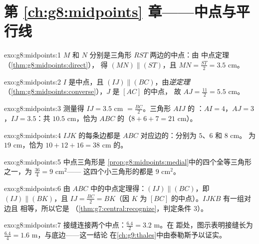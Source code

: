 \section*{第 \ref{ch:g8:midpoints} 章——中点与平行线}

\begin{solution}{exo:g8:midpoints:1}
$M$ 和 $N$ 分别是三角形 $RST$ 两边的中点：由
中点定理（\cref{thm:g8:midpoints:direct}），
得 $(MN) \parallel (ST)$，且 $MN = \frac{ST}{2} = 3.5$ cm。
\end{solution}

\begin{solution}{exo:g8:midpoints:2}
$I$ 是中点，且 $(IJ) \parallel (BC)$，由\emph{逆定理}
（\cref{thm:g8:midpoints:converse}），$J$ 是 $[AC]$ 的中点，
故 $AJ = \frac{11}{2} = 5.5$ cm。
\end{solution}

\begin{solution}{exo:g8:midpoints:3}
测量得 $IJ = 3.5$ cm $= \frac{BC}{2}$。三角形 $AIJ$ 的
：$AI = 4$，$AJ = 3$，$IJ = 3.5$：共 $10.5$ cm，恰为
$ABC$ 的（$8 + 6 + 7 = 21$ cm）。
\end{solution}

\begin{solution}{exo:g8:midpoints:4}
$IJK$ 的每条边都是 $ABC$ 对应边的：分别为 $5$、$6$ 和 $8$ cm。
为 $19$ cm，恰为 $10 + 12 + 16 = 38$ cm 的。
\end{solution}

\begin{solution}{exo:g8:midpoints:5}
中点三角形是
\cref{prop:g8:midpoints:medial}中的四个全等三角形之一，为 $\frac{36}{4} = 9$ cm$^2$——
这四个小三角形的都是 $9$ cm$^2$。
\end{solution}

\begin{solution}{exo:g8:midpoints:6}
由 $ABC$ 中的中点定理得：$(IJ) \parallel (BC)$，即
$(IJ) \parallel (BK)$，且 $IJ = \frac{BC}{2} = BK$（因 $K$ 为
$[BC]$ 的中点）。$IJKB$ 有一组对边且
相等，所以它是
（\cref{thm:g7:central:recognize}，判定条件 3）。
\end{solution}

\begin{solution}{exo:g8:midpoints:7}
接缝连接两个中点：$\frac{6.4}{2} = 3.2$ m。在
距处，图示表明接缝长为
$\frac{6.4}{4} = 1.6$ m，与底边——这一结论
在\cref{ch:g9:thales}中由泰勒斯予以证实。
\end{solution}

